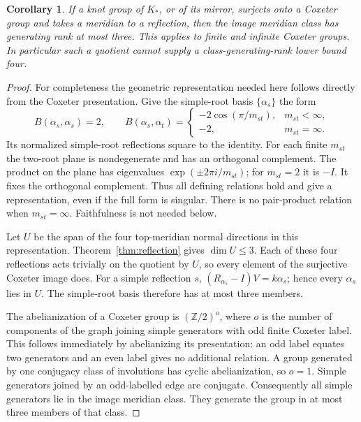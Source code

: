 \documentclass[11pt]{article}
\newtheorem{corollary}[theorem]{Corollary}
\begin{document}
\begin{corollary}\label{cor:coxeter}
If a knot group of $K_*$, or of its mirror, surjects onto a Coxeter
group and takes a meridian to a reflection, then the image meridian
class has generating rank at most three. This applies to finite and
infinite Coxeter groups. In particular such a quotient cannot supply
a class-generating-rank lower bound four.
\end{corollary}
\begin{proof}
For completeness the geometric representation needed here follows
directly from the Coxeter presentation. Give the simple-root basis
$\{\alpha_s\}$ the form
\[
 B(\alpha_s,\alpha_s)=2,\qquad
 B(\alpha_s,\alpha_t)=
 \begin{cases}
 -2\cos(\pi/m_{st}),&m_{st}<\infty,\\
 -2,&m_{st}=\infty.
 \end{cases}
\]
Its normalized simple-root reflections square to the identity.
For each finite $m_{st}$ the two-root plane is nondegenerate and
has an orthogonal complement. The product on the plane has
eigenvalues $\exp(\pm2\pi i/m_{st})$; for $m_{st}=2$ it is $-I$.
It fixes the orthogonal complement. Thus all defining relations
hold and give a representation, even if the full form is singular.
There is no pair-product relation when $m_{st}=\infty$.
Faithfulness is not needed below.

Let $U$ be the span of the four top-meridian normal directions in
this representation. Theorem~\ref{thm:reflection} gives $\dim U\le3$.
Each of these four reflections acts trivially on the quotient by
$U$, so every element of the surjective Coxeter image does.
For a simple reflection $s$,
$(R_{\alpha_s}-I)V=k\alpha_s$; hence every $\alpha_s$ lies in $U$.
The simple-root basis therefore has at most three members.

The abelianization of a Coxeter group is
$(\mathbb Z/2)^{o}$, where $o$ is the number of components of the
graph joining simple generators with odd finite Coxeter label.
This follows immediately by abelianizing its presentation:
an odd label equates two generators and an even label gives no
additional relation. A group generated by one conjugacy class of
involutions has cyclic abelianization, so $o=1$.
Simple generators joined by an odd-labelled edge are conjugate.
Consequently all simple generators lie in the image meridian class.
They generate the group in at most three members of that class.
\end{proof}
\end{document}
